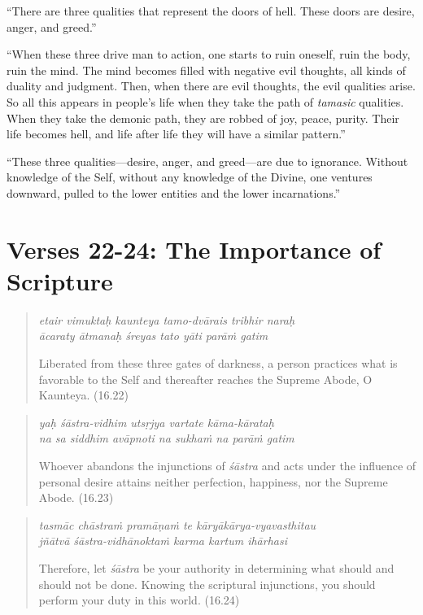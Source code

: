 \documentclass[12pt, twoside, openright]{memoir}
\begin{document}
\enquote{There are three qualities that represent the doors of hell. These doors are desire, anger, and greed.}

\enquote{When these three drive man to action, one starts to ruin oneself, ruin the body, ruin the mind. The mind becomes filled with negative evil thoughts, all kinds of duality and judgment. Then, when there are evil thoughts, the evil qualities arise. So all this appears in people’s life when they take the path of \textit{tamasic} qualities. When they take the demonic path, they are robbed of joy, peace, purity. Their life becomes hell, and life after life they will have a similar pattern.}

\enquote{These three qualities---desire, anger, and greed---are due to ignorance. Without knowledge of the Self, without any knowledge of the Divine, one ventures downward, pulled to the lower entities and the lower incarnations.}

\section{Verses 22-24: The Importance of Scripture}\label{sec-verses-22-24-the-importance-of-scripture}


\par
\begin{verse}
\textit{etair vimuktaḥ kaunteya tamo-dvārais tribhir naraḥ} \\
\textit{ācaraty ātmanaḥ śreyas tato yāti parāṁ gatim}

\noindent Liberated from these three gates of darkness, a person practices what is favorable to the Self and thereafter reaches the Supreme Abode, O Kaunteya. (16.22)
\end{verse}
\par



\par
\begin{verse}
\textit{yaḥ śāstra-vidhim utsṛjya vartate kāma-kārataḥ} \\
\textit{na sa siddhim avāpnoti na sukhaṁ na parāṁ gatim}

\noindent Whoever abandons the injunctions of \textit{śāstra} and acts under the influence of personal desire attains neither perfection, happiness, nor the Supreme Abode. (16.23)
\end{verse}
\par



\par
\begin{verse}
\textit{tasmāc chāstraṁ pramāṇaṁ te kāryākārya-vyavasthitau} \\
\textit{jñātvā śāstra-vidhānoktaṁ karma kartum ihārhasi}

\noindent Therefore, let \textit{śāstra} be your authority in determining what should and should not be done. Knowing the scriptural injunctions, you should perform your duty in this world. (16.24)
\end{verse}
\par
\end{document}
